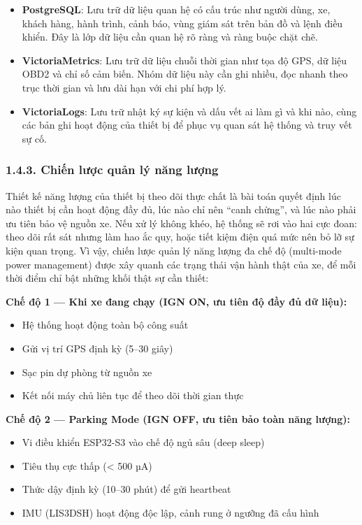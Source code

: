 \documentclass[a4paper]{extarticle}
\providecommand{\tightlist}{%
  \setlength{\itemsep}{0pt}\setlength{\parskip}{0pt}}
\begin{document}
\begin{itemize}
\tightlist
\item
  \textbf{PostgreSQL}: Lưu trữ dữ liệu quan hệ có cấu trúc như người
  dùng, xe, khách hàng, hành trình, cảnh báo, vùng giám sát trên bản đồ
  và lệnh điều khiển. Đây là lớp dữ liệu cần quan hệ rõ ràng và ràng
  buộc chặt chẽ.
\item
  \textbf{VictoriaMetrics}: Lưu trữ dữ liệu chuỗi thời gian như tọa độ
  GPS, dữ liệu OBD2 và chỉ số cảm biến. Nhóm dữ liệu này cần ghi nhiều,
  đọc nhanh theo trục thời gian và lưu dài hạn với chi phí hợp lý.
\item
  \textbf{VictoriaLogs}: Lưu trữ nhật ký sự kiện và dấu
  vết ai làm gì và khi nào, cùng các bản
  ghi hoạt động của thiết bị để phục vụ quan sát hệ thống và truy vết sự
  cố.
\end{itemize}

\subsubsection{1.4.3. Chiến lược quản lý năng
lượng}\label{143-chiux1ebfn-lux1b0ux1ee3c-quux1ea3n-luxfd-nux103ng-lux1b0ux1ee3ng}

Thiết kế năng lượng của thiết bị theo dõi thực chất là bài toán quyết định lúc nào
thiết bị cần hoạt động đầy đủ, lúc nào chỉ nên ``canh chừng'', và lúc nào
phải ưu tiên bảo vệ nguồn xe. Nếu xử lý không khéo, hệ thống sẽ rơi vào
hai cực đoan: theo dõi rất sát nhưng làm hao ắc quy, hoặc tiết kiệm điện
quá mức nên bỏ lỡ sự kiện quan trọng. Vì vậy, chiến lược quản lý năng
lượng đa chế độ (multi-mode power management) được xây quanh các trạng
thái vận hành thật của xe, để mỗi thời điểm chỉ bật những khối thật sự
cần thiết:

\textbf{Chế độ 1 --- Khi xe đang chạy (IGN ON, ưu tiên độ đầy đủ dữ liệu):}

\begin{itemize}
\tightlist
\item
  Hệ thống hoạt động toàn bộ công suất
\item
  Gửi vị trí GPS định kỳ (5--30 giây)
\item
  Sạc pin dự phòng từ nguồn xe
\item
  Kết nối máy chủ liên tục để theo dõi thời gian thực
\end{itemize}

\textbf{Chế độ 2 --- Parking Mode (IGN OFF, ưu tiên bảo toàn năng lượng):}

\begin{itemize}
\tightlist
\item
  Vi điều khiển ESP32-S3 vào chế độ ngủ sâu (deep sleep)
\item
  Tiêu thụ cực thấp (\textless{} 500 µA)
\item
  Thức dậy định kỳ (10--30 phút) để gửi heartbeat
\item
  IMU (LIS3DSH) hoạt động độc lập, cảnh rung ở ngưỡng đã cấu hình
\end{itemize}
\end{document}
